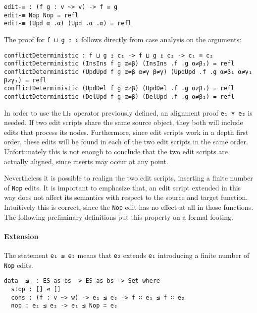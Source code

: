 \documentclass[../Thesis.tex]{subfiles}
\begin{document}
\begin{verbatim}
edit-≡ : (f g : v ~> v) -> f ≡ g
edit-≡ Nop Nop = refl
edit-≡ (Upd α .α) (Upd .α .α) = refl
\end{verbatim}	
	
	The proof for \texttt{f ⊔ g ↥ c} follows directly from case analysis on the 
	arguments:
	
\begin{verbatim}
conflictDeterministic : f ⊔ g ↥ c₁ -> f ⊔ g ↥ c₂ -> c₁ ≡ c₂
conflictDeterministic (InsIns f g α≠β) (InsIns .f .g α≠β₁) = refl
conflictDeterministic (UpdUpd f g α≠β α≠γ β≠γ) (UpdUpd .f .g α≠β₁ α≠γ₁ β≠γ₁) = refl
conflictDeterministic (UpdDel f g α≠β) (UpdDel .f .g α≠β₁) = refl
conflictDeterministic (DelUpd f g α≠β) (DelUpd .f .g α≠β₁) = refl
\end{verbatim}	


	In order to use the \texttt{⨆₃} operator previously defined, an alignment
	proof \texttt{e₁ ⋎ e₂} is needed.
	If two edit scripts share the same source object, they both will include 
	edits that process its nodes. Furthermore, since edit scripts work 
	in a depth first order, these edits will be found in each 
	of the two edit scripts in the same order.
	Unfortunately this is not enough to conclude that the two edit scripts 
	are actually aligned, since inserts may occur at any point.
		
	Nevertheless it is possible to realign the two edit scripts, inserting
	a finite number of \texttt{Nop} edits.	
	It is important to emphasize that, an edit script extended in this way
	does not affect its semantics with respect to the source and target function.
	Intuitively this is correct, since the \texttt{Nop} edit has no effect at all
	in those functions.
	The following preliminary definitions put this property on a formal footing.

	\paragraph{Extension}
	\label{par:Extension}
	The statement \texttt{e₁ ⊴ e₂} means that \texttt{e₂} extends \texttt{e₁}
	introducing a finite number of \texttt{Nop} edits.
	
\begin{verbatim}
data _⊴_ : ES as bs -> ES as bs -> Set where
  stop : [] ⊴ []
  cons : (f : v ~> w) -> e₁ ⊴ e₂ -> f ∷ e₁ ⊴ f ∷ e₂
  nop : e₁ ⊴ e₂ -> e₁ ⊴ Nop ∷ e₂
\end{verbatim}
		
\end{document}
